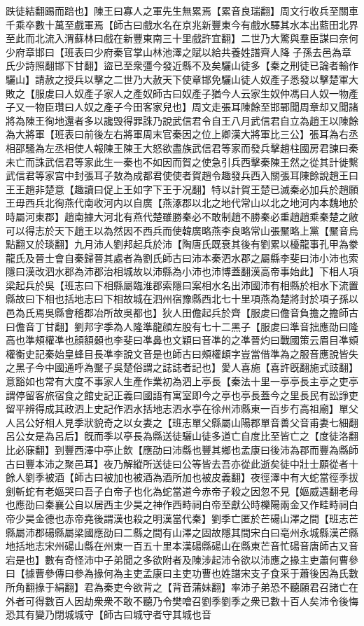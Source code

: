 跌徒結翻踢而踣也】陳王曰寡人之軍先生無累焉【累音良瑞翻】周文行收兵至關車千乘卒數十萬至戲軍焉【師古曰戲水名在京兆新豐東今有戲水驛其水本出藍田北界至此而北流入渭蘇林曰戲在新豐東南三十里戲許宜翻】二世乃大驚與羣臣謀曰奈何少府章邯曰【班表曰少府秦官掌山林池澤之賦以給共養姓譜齊人降子孫去邑為章氏少詩照翻邯下甘翻】盜已至衆彊今發近縣不及矣驪山徒多【秦之刑徒已論者輸作驪山】請赦之授兵以擊之二世乃大赦天下使章邯免驪山徒人奴產子悉發以擊楚軍大敗之【服䖍曰人奴產子家人之產奴師古曰奴產子猶今人云家生奴仲馮曰人奴一物產子又一物臣瓚曰人奴之產子今田客家兒也】周文走張耳陳餘至邯鄲聞周章却又聞諸將為陳王徇地還者多以讒毁得罪誅乃說武信君令自王八月武信君自立為趙王以陳餘為大將軍【班表曰前後左右將軍周末官秦因之位上卿漢大將軍比三公】張耳為右丞相邵騷為左丞相使人報陳王陳王大怒欲盡族武信君等家而發兵擊趙柱國房君諫曰秦未亡而誅武信君等家此生一秦也不如因而賀之使急引兵西擊秦陳王然之從其計徙繫武信君等家宫中封張耳子敖為成都君使使者賀趙令趣發兵西入關張耳陳餘說趙王曰王王趙非楚意【趣讀曰促上王如字下王于况翻】特以計賀王楚已滅秦必加兵於趙願王毋西兵北徇燕代南收河内以自廣【燕涿郡以北之地代常山以北之地河内本魏地於時屬河東郡】趙南據大河北有燕代楚雖勝秦必不敢制趙不勝秦必重趙趙乘秦楚之敝可以得志於天下趙王以為然因不西兵而使韓廣略燕李良略常山張黶略上黨【黶音烏點翻又於琰翻】九月沛人劉邦起兵於沛【陶唐氏既衰其後有劉累以櫌龍事孔甲為豢龍氏及晉士會自秦歸晉其處者為劉氏師古曰沛本秦泗水郡之屬縣李斐曰沛小沛也索隱曰漢改泗水郡為沛郡治相城故以沛縣為小沛也沛博蓋翻漢高帝事始此】下相人項梁起兵於吳【班志曰下相縣屬臨淮郡索隱曰案相水名出沛國沛有相縣於相水下流置縣故曰下相也括地志曰下相故城在泗州宿豫縣西北七十里項燕為楚將封於項子孫以邑為氏焉吳縣會稽郡冶所故吳都也】狄人田儋起兵於齊【服䖍曰儋音負擔之擔師古曰儋音丁甘翻】劉邦字季為人隆準龍顔左股有七十二黑子【服䖍曰準音拙應劭曰隆高也準頰權凖也顔額顙也李斐曰凖鼻也文穎曰音凖的之凖晉灼曰戰國策云眉目凖頞權衡史記秦始皇蜂目長凖李說文音是也師古曰頰權䪼字豈當借準為之服音應說皆失之黑子今中國通呼為黶子吳楚俗謂之誌誌者記也】愛人喜施【喜許旣翻施式豉翻】意豁如也常有大度不事家人生產作業初為泗上亭長【秦法十里一亭亭長主亭之吏亭謂停留客旅宿食之館史記正義曰國語有寓室即今之亭也亭長蓋今之里長民有訟諍吏留平辨得成其政泗上史記作泗水括地志泗水亭在徐州沛縣東一百步冇高祖廟】單父人呂公好相人見季狀貌奇之以女妻之【班志單父縣屬山陽郡單音善父音甫妻七細翻呂公女是為呂后】旣而季以亭長為縣送徒驪山徒多道亡自度比至皆亡之【度徒洛翻比必寐翻】到豐西澤中亭止飲【應劭曰沛縣也豐其鄉也孟康曰後沛為郡而豐為縣師古曰豐本沛之聚邑耳】夜乃解縱所送徒曰公等皆去吾亦從此逝矣徒中壯士願從者十餘人劉季被酒【師古曰被加也被酒為酒所加也被皮義翻】夜徑澤中有大蛇當徑季拔劍斬蛇有老嫗哭曰吾子白帝子也化為蛇當道今赤帝子殺之因忽不見【嫗威遇翻老母也應劭曰秦襄公自以居西主少昊之神作西畤祠白帝至獻公時櫟陽兩金又作畦畤祠白帝少昊金德也赤帝堯後謂漢也殺之明漢當代秦】劉季亡匿於芒碭山澤之間【班志芒縣屬沛郡碭縣屬梁國應劭曰二縣之間有山澤之固故隱其間宋白曰亳州永城縣漢芒縣地括地志宋州碭山縣在州東一百五十里本漢碭縣碭山在縣東芒音忙碭音唐師古又音宕是也】數有奇怪沛中子弟聞之多欲附者及陳涉起沛令欲以沛應之掾主吏蕭何曹參曰【據曹參傳曰參為掾何為主吏孟康曰主吏功曹也姓譜宋支子食采于蕭後因為氏數所角翻掾于絹翻】君為秦吏今欲背之【背音蒲妹翻】率沛子弟恐不聽願君召諸亡在外者可得數百人因劫衆衆不敢不聽乃令樊噲召劉季劉季之衆已數十百人矣沛令後悔恐其有變乃閉城城守【師古曰城守者守其城也音